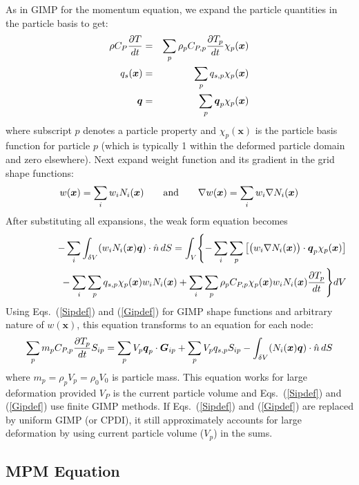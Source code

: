 \documentclass[11pt]{article}
\renewcommand{\vec}[1]{\boldsymbol{#1}}
\begin{document}
As in GIMP for the momentum equation, we expand the particle quantities in the particle basis to get:
\begin{eqnarray}
    \rho C_P {\partial T\over dt} & = & \sum_p \rho_p C_{P,p} {\partial T_p\over dt} \chi_p(\vec x) \\
    q_s(\vec x) & = & \sum_p q_{s,p} \chi_p(\vec x) \\
    \vec q & = & \sum_p \vec q_p\chi_p(\vec x)
\end{eqnarray}
where subscript $p$ denotes a particle property and $\chi_p(\vec x)$ is the particle basis function for particle $p$ (which is typically 1 within the deformed particle domain and zero elsewhere). Next expand weight function and its gradient in the grid shape functions:
\begin{equation}
   w(\vec x)=\sum_i w_i N_i(\vec x) \qquad {\rm and} \qquad \nabla w(\vec x)=\sum_i w_i \nabla N_i(\vec x)
\end{equation}
After substituting all expansions, the weak form equation becomes
\begin{eqnarray}
&& -\sum_i \int_{\delta V} (w_iN_i(\vec x)\vec q)\cdot \hat n \thinspace dS = 
\int_{V} \Biggl\{-\sum_i\sum_p\left[\bigl(w_i\nabla N_i(\vec x)\bigr)\cdot \vec q_p\chi_p(\vec x)\right] \\
&& \qquad\qquad\mbox{} - 
\sum_i\sum_p q_{s,p}\chi_p(\vec x)w_iN_i(\vec x)
+  \sum_i\sum_p \rho_p C_{P,p}\chi_p(\vec x) w_iN_i(\vec x){\partial T_p\over dt}\Biggr\} dV
\end{eqnarray}
Using Eqs.~(\ref{Sipdef}) and (\ref{Gipdef}) for GIMP shape functions and arbitrary nature of $w(\vec x)$, this equation transforms  to an equation for each node:
\begin{equation}
    \sum_p  m_p C_{P,p}{\partial T_p\over dt}S_{ip} = \sum_p V_p \vec q_p\cdot \vec G_{ip}  + \sum_p  V_p q_{s,p} S_{ip}  - 
 \int_{\delta V} (N_i(\vec x)\vec q)\cdot \hat n \thinspace dS
\end{equation}
where $m_p = \rho_p V_p = \rho_0 V_0$ is particle mass. This equation works for large deformation provided $V_P$ is the current particle volume and Eqs.~(\ref{Sipdef}) and (\ref{Gipdef}) use finite GIMP methods. If Eqs.~(\ref{Sipdef}) and (\ref{Gipdef}) are replaced by uniform GIMP (or CPDI), it still approximately accounts for large deformation by using current particle volume ($V_p$) in the sums.

\subsection{MPM Equation}
\end{document}
